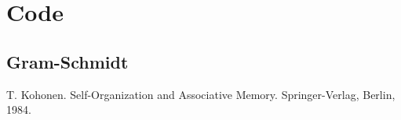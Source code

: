 \newpage

\appendix

\section{Code}

\subsection{Gram-Schmidt} \label{code:gram_schmidt}




\begin{thebibliography}{10}
    T. Kohonen. Self-Organization and Associative Memory. Springer-Verlag, Berlin, 1984.

\end{thebibliography}

